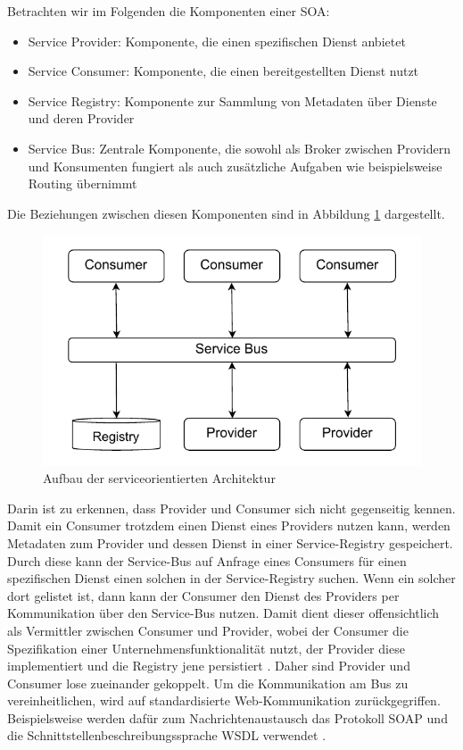 \documentclass[acmtog]{acmart}
\begin{document}
Betrachten wir im Folgenden die Komponenten einer SOA:
\begin{itemize}
  \item Service Provider: Komponente, die einen spezifischen Dienst anbietet
  \item Service Consumer: Komponente, die einen bereitgestellten Dienst nutzt
  \item Service Registry: Komponente zur Sammlung von Metadaten über Dienste und deren Provider
  \item Service Bus: Zentrale Komponente, die sowohl als Broker zwischen Providern und Konsumenten fungiert als auch zusätzliche Aufgaben wie beispielsweise Routing übernimmt
\end{itemize}

Die Beziehungen zwischen diesen Komponenten sind in Abbildung \ref{fig:soa} dargestellt.
\begin{figure}[!h]
  \centering
  \includegraphics[width=0.8\linewidth]{images/soa/soa.pdf}
  \caption{Aufbau der serviceorientierten Architektur}
  \label{fig:soa}
\end{figure}
Darin ist zu erkennen, dass Provider und Consumer sich nicht gegenseitig kennen.
Damit ein Consumer trotzdem einen Dienst eines Providers nutzen kann, werden Metadaten zum Provider und dessen Dienst in einer Service-Registry gespeichert.
Durch diese kann der Service-Bus auf Anfrage eines Consumers für einen spezifischen Dienst einen solchen in der Service-Registry suchen.
Wenn ein solcher dort gelistet ist, dann kann der Consumer den Dienst des Providers per Kommunikation über den Service-Bus nutzen.
Damit dient dieser offensichtlich als Vermittler zwischen Consumer und Provider, wobei der Consumer die Spezifikation einer Unternehmensfunktionalität nutzt,
der Provider diese implementiert und die Registry jene persistiert \cite[103]{soa3}\cite[37]{soa4}.
Daher sind Provider und Consumer lose zueinander gekoppelt.
Um die Kommunikation am Bus zu vereinheitlichen, wird auf standardisierte Web-Kommunikation zurückgegriffen.
Beispielsweise werden dafür zum Nachrichtenaustausch das Protokoll SOAP und die Schnittstellenbeschreibungssprache WSDL verwendet \cite[1]{soa}.
\end{document}

